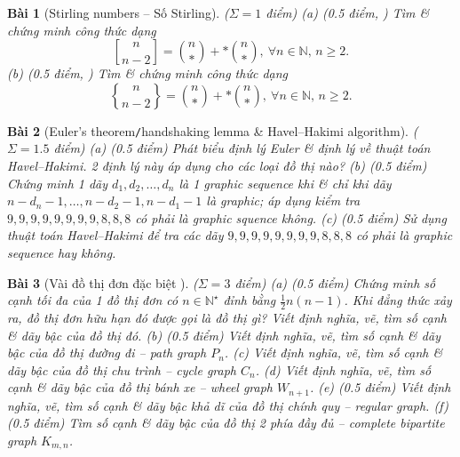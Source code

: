 \documentclass{article}
\newtheorem{baitoan}{Bài}
\newcommand{\genstirlingI}[3]{%
    \genfrac{[}{]}{0pt}{#1}{#2}{#3}%
}
\newcommand{\genstirlingII}[3]{%
    \genfrac{\{}{\}}{0pt}{#1}{#2}{#3}%
}
\newcommand{\stirlingI}[2]{\genstirlingI{}{#1}{#2}}
\newcommand{\stirlingII}[2]{\genstirlingII{}{#1}{#2}}
\begin{document}
\begin{baitoan}[Stirling numbers -- Số Stirling]
    {\rm($\Sigma = 1$ điểm)} (a) {\rm(0.5 điểm, \cite[P6.1.13]{Shahriari2022})} Tìm \& chứng minh công thức dạng
    \begin{equation*}
        \stirlingI{n}{n - 2} = \binom{n}{*} + *\binom{n}{*},\ \forall n\in\mathbb{N},\,n\ge2.
    \end{equation*}
    (b) {\rm(0.5 điểm, \cite[P6.2.7]{Shahriari2022})} Tìm \& chứng minh công thức dạng
    \begin{equation*}
        \stirlingII{n}{n - 2} = \binom{n}{*} + *\binom{n}{*},\ \forall n\in\mathbb{N},\,n\ge2.
    \end{equation*}  
\end{baitoan}

\begin{baitoan}[Euler's theorem{\tt/}handshaking lemma \& Havel--Hakimi algorithm]
    {\rm($\Sigma = 1.5$ điểm)} (a) {\rm(0.5 điểm)} Phát biểu định lý Euler \& định lý về thuật toán Havel--Hakimi. 2 định lý này áp dụng cho các loại đồ thị nào? (b) {\rm(0.5 điểm) \cite[P10.1.13, p. 368]{Shahriari2022}} Chứng minh 1 dãy $d_1,d_2,\ldots,d_n$ là 1 graphic sequence khi \& chỉ khi dãy $n - d_n - 1,\ldots,n - d_2 - 1,n - d_1 - 1$ là graphic; áp dụng kiểm tra $9,9,9,9,9,9,9,9,8,8,8$ có phải là graphic squence không. (c) {\rm(0.5 điểm)} Sử dụng thuật toán Havel--Hakimi để tra các dãy $9,9,9,9,9,9,9,9,8,8,8$ có phải là graphic sequence hay không.
\end{baitoan}

\begin{baitoan}[Vài đồ thị đơn đặc biệt \cite{Valiente2021}]
    {\rm($\Sigma = 3$ điểm)} (a) {\rm(0.5 điểm)} Chứng minh số cạnh tối đa của 1 đồ thị đơn có $n\in\mathbb{N}^\star$ đỉnh bằng $\frac{1}{2}n(n - 1)$. Khi đẳng thức xảy ra, đồ thị đơn hữu hạn đó được gọi là đồ thị gì? Viết định nghĩa, vẽ, tìm số cạnh \& dãy bậc của đồ thị đó. (b) {\rm(0.5 điểm)} Viết định nghĩa, vẽ, tìm số cạnh \& dãy bậc của đồ thị đường đi -- path graph $P_n$. (c) Viết định nghĩa, vẽ, tìm số cạnh \& dãy bậc của đồ thị chu trình -- cycle graph $C_n$. (d) Viết định nghĩa, vẽ, tìm số cạnh \& dãy bậc của đồ thị bánh xe -- wheel graph $W_{n+1}$. (e) {\rm(0.5 điểm)} Viết định nghĩa, vẽ, tìm số cạnh \& dãy bậc khả dĩ của đồ thị chính quy -- regular graph. (f) {\rm(0.5 điểm)} Tìm số cạnh \& dãy bậc của đồ thị 2 phía đầy đủ -- complete bipartite graph $K_{m,n}$.
\end{baitoan}


\printbibliography[heading=bibintoc]
\end{document}
